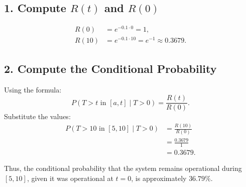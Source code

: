 \documentclass[12pt]{article}
\begin{document}
	\subsection*{1. Compute \(R(t)\) and \(R(0)\)}
	\begin{align}
		R(0) &= e^{-0.1 \cdot 0} = 1, \\
		R(10) &= e^{-0.1 \cdot 10} = e^{-1} \approx 0.3679.
	\end{align}
	
	\subsection*{2. Compute the Conditional Probability}
	Using the formula:
	\begin{equation}
		P(T > t \text{ in } [a, t] \mid T > 0) = \frac{R(t)}{R(0)}.
	\end{equation}
	Substitute the values:
	\begin{align}
		P(T > 10 \text{ in } [5, 10] \mid T > 0) &= \frac{R(10)}{R(0)} \\
		&= \frac{0.3679}{1} \\
		&= 0.3679.
	\end{align}
	
	Thus, the conditional probability that the system remains operational during \([5, 10]\), given it was operational at \(t = 0\), is approximately \(36.79\%\).
	
	
\end{document}
